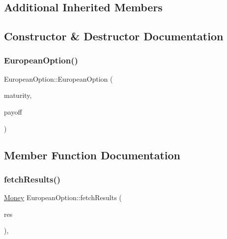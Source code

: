 \subsection*{Additional Inherited Members}


\subsection{Constructor \& Destructor Documentation}
\hypertarget{class_european_option_a92132b61922cb628bc355d4d9f302513}{}\label{class_european_option_a92132b61922cb628bc355d4d9f302513} 
\subsubsection{\texorpdfstring{European\+Option()}{EuropeanOption()}}
{\footnotesize\ttfamily European\+Option\+::\+European\+Option (\begin{DoxyParamCaption}\item[{\hyperlink{_name_def_8h_ac2d3e0ba793497bcca555c7c2cf64ff3}{Time}}]{maturity,  }\item[{std\+::shared\+\_\+ptr$<$ \hyperlink{class_payoff}{Payoff} $>$}]{payoff }\end{DoxyParamCaption})}



\subsection{Member Function Documentation}
\hypertarget{class_european_option_ae234d562ef21dc24c25f1538860da1cf}{}\label{class_european_option_ae234d562ef21dc24c25f1538860da1cf} 
\subsubsection{\texorpdfstring{fetch\+Results()}{fetchResults()}}
{\footnotesize\ttfamily \hyperlink{_name_def_8h_a5a9d48c16a694e9a2d9f1eca730dc8c5}{Money} European\+Option\+::fetch\+Results (\begin{DoxyParamCaption}\item[{\hyperlink{class_pricing_engine_1_1_results}{Pricing\+Engine\+::\+Results} $\ast$const}]{res }\end{DoxyParamCaption})\hspace{0.3cm}{\ttfamily [override]}, {\ttfamily [virtual]}}



